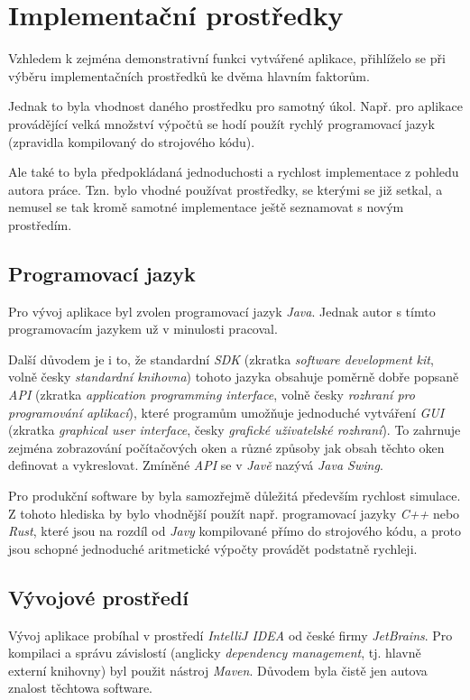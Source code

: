 \section{Implementační prostředky}

Vzhledem k zejména demonstrativní funkci vytvářené aplikace, přihlíželo se při výběru implementačních prostředků ke dvěma hlavním faktorům.

Jednak to byla vhodnost daného prostředku pro samotný úkol. Např. pro aplikace provádějící velká množství výpočtů se hodí použít rychlý programovací jazyk (zpravidla kompilovaný do strojového kódu).

Ale také to byla předpokládaná jednoduchosti a rychlost implementace z pohledu autora práce. Tzn. bylo vhodné používat prostředky, se kterými se již setkal, a nemusel se tak kromě samotné implementace ještě seznamovat s novým prostředím.

\subsection{Programovací jazyk}

Pro vývoj aplikace byl zvolen programovací jazyk \emph{Java}\src. Jednak autor s tímto programovacím jazykem už v minulosti pracoval.

Další důvodem je i to, že standardní \emph{SDK} (zkratka \emph{software development kit}, volně česky \emph{standardní knihovna}) tohoto jazyka obsahuje poměrně dobře popsaně \emph{API} (zkratka \emph{application programming interface}, volně česky \emph{rozhraní pro programování aplikací}), které programům umožňuje jednoduché vytváření \emph{GUI} (zkratka \emph{graphical user interface}, česky \emph{grafické uživatelské rozhraní}). To zahrnuje zejména zobrazování počítačových oken a různé způsoby jak obsah těchto oken definovat a vykreslovat. Zmíněné \emph{API} se v \emph{Javě} nazývá \emph{Java Swing}.\src

Pro produkční software by byla samozřejmě důležitá především rychlost simulace. Z tohoto hlediska by bylo vhodnější použít např. programovací jazyky \emph{C++} nebo \emph{Rust}, které jsou na rozdíl od \emph{Javy} kompilované přímo do strojového kódu, a proto jsou schopné jednoduché aritmetické výpočty provádět podstatně rychleji.

\subsection{Vývojové prostředí}

Vývoj aplikace probíhal v prostředí \emph{IntelliJ IDEA} od české firmy \emph{JetBrains}. Pro kompilaci a správu závislostí (anglicky \emph{dependency management}, tj. hlavně externí knihovny) byl použit nástroj \emph{Maven}. Důvodem byla čistě jen autova znalost těchtowa software. 
